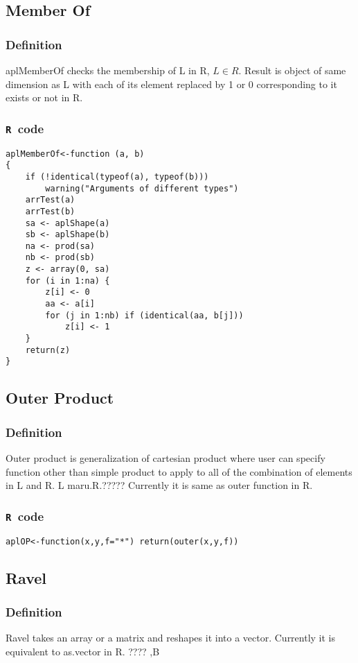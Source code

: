 \documentclass[11pt]{amsart}
\theoremstyle{plain}
\theoremstyle{definition}
\theoremstyle{remark}
\newcommand{\tR}{\texttt{R}}
\begin{document}
\subsection{Member Of}\quad
\subsubsection{Definition}
aplMemberOf checks the membership of L in R, $L \in R$.  Result is object of same dimension as L with each of its element replaced by 1 or 0 corresponding to it exists or not in R.
\subsubsection{\tR\ code}\quad
\begin{lstlisting}
aplMemberOf<-function (a, b)
{
    if (!identical(typeof(a), typeof(b)))
        warning("Arguments of different types")
    arrTest(a)
    arrTest(b)
    sa <- aplShape(a)
    sb <- aplShape(b)
    na <- prod(sa)
    nb <- prod(sb)
    z <- array(0, sa)
    for (i in 1:na) {
        z[i] <- 0
        aa <- a[i]
        for (j in 1:nb) if (identical(aa, b[j]))
            z[i] <- 1
    }
    return(z)
}
\end{lstlisting}

\subsection{Outer Product}\quad
\subsubsection{Definition}
Outer product is generalization of cartesian product where user can specify function other than simple product to apply to all of the combination of elements in L and R. L maru.R.?????  Currently it is same as outer function in R. 
\subsubsection{\tR\ code}\quad

\begin{lstlisting}
aplOP<-function(x,y,f="*") return(outer(x,y,f))
\end{lstlisting}

\subsection{Ravel}\quad
\subsubsection{Definition}
Ravel takes an array or a matrix and reshapes it into a vector. Currently it is equivalent to as.vector in R. ???? ,B
\end{document}
